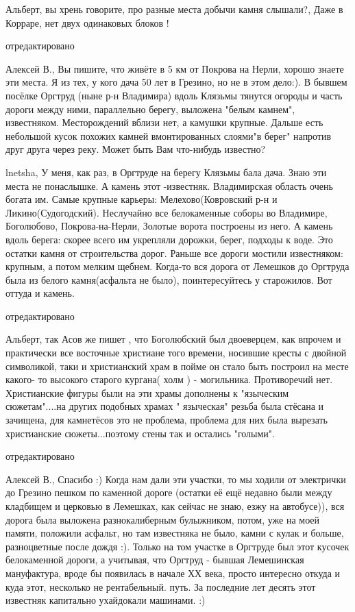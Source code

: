 \begin{itemize}

Альберт, вы хрень говорите, про разные места добычи камня слышали?, Даже в
Корраре, нет двух одинаковых блоков !

отредактировано

Алексей В., Вы пишите, что живёте в 5 км от Покрова на Нерли, хорошо знаете эти
места. Я из тех, у кого дача 50 лет в Грезино, но не в этом дело:). В бывшем
посёлке Оргтруд (ныне р-н Владимира) вдоль Клязьмы тянутся огороды и часть
дороги между ними, параллельно берегу, выложена "белым камнем", известняком.
Месторождений вблизи нет, а камушки крупные. Дальше есть небольшой кусок
похожих камней вмонтированных слоями"в берег" напротив друг друга через реку.
Может быть Вам что-нибудь известно?


lnetsha, У меня, как раз, в Оргтруде на берегу Клязьмы бала дача. Знаю эти
места не понаслышке. А камень этот -известняк. Владимирская область очень
богата им. Самые крупные карьеры: Мелехово(Ковровский р-н и
Ликино(Судогодский). Неслучайно все белокаменные соборы во Владимире,
Боголюбово, Покрова-на-Нерли, Золотые ворота построены из него. А камень вдоль
берега: скорее всего им укрепляли дорожки, берег, подходы к воде. Это остатки
камня от строительства дорог. Раньше все дороги мостили известняком: крупным, а
потом мелким щебнем. Когда-то вся дорога от Лемешков до Оргтруда была из белого
камня(асфальта не было), поинтересуйтесь у старожилов. Вот оттуда и камень.

отредактировано

Альберт, так Асов же пишет , что Боголюбский был двоеверцем, как впрочем и
практически все восточные христиане того времени, носившие кресты с двойной
символикой, таки и христианский храм в пойме он стало быть построил на месте
какого- то высокого старого кургана( холм ) - могильника. Противоречий нет.
Христианские фигуры были на эти храмы дополнены к "языческим сюжетам"....на
других подобных храмах " языческая" резьба была стёсана и зачищена, для
камнетёсов это не проблема, проблема для них была вырезать христианские
сюжеты...поэтому стены так и остались "голыми".

отредактировано

Алексей В., Спасибо :) Когда нам дали эти участки, то мы ходили от электрички
до Грезино пешком по каменной дороге (остатки её ещё недавно были между
кладбищем и церковью в Лемешках, как сейчас не знаю, езжу на автобусе)), вся
дорога была выложена разнокалиберным булыжником, потом, уже на моей памяти,
положили асфальт, но там известняка не было, камни с кулак и больше,
разноцветные после дождя :). Только на том участке в Оргтруде был этот кусочек
белокаменной дороги, а учитывая, что Оргтруд - бывшая Лемешинская мануфактура,
вроде бы появилась в начале ХХ века, просто интересно откуда и куда этот,
несколько не рентабельный. путь. За последние лет десять этот известняк
капитально ухайдокали машинами. :)


\end{itemize}
